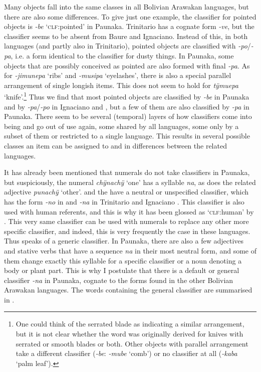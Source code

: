 Many objects fall into the same classes in all Bolivian Arawakan languages, but there are also some differences. To give just one example, the classifier for pointed objects is \textit{-be} ‘\textsc{clf:}pointed’ in Paunaka. Trinitario has a cognate form \textit{-ve}, but the classifier seems to be absent from Baure and Ignaciano. Instead of this, in both languages (and partly also in Trinitario), pointed objects are classified with \textit{-po}/\textit{-pa}, i.e. a form identical to the classifier for dusty things. In Paunaka, some objects that are possibly conceived as pointed are also formed with final \textit{-pa}. As for \textit{-jimunepa} ‘ribs’ and \textit{-musipa} ‘eyelashes’, there is also a special parallel arrangement of single longish items. This does not seem to hold for \textit{tÿmuepa} ‘knife’.\footnote{One could think of the serrated blade as indicating a similar arrangement, but it is not clear whether the word was originally derived for knives with serrated or smooth blades or both. Other objects with parallel arrangement take a different classifier (\textit{-be}: \textit{-mube} ‘comb’) or no classifier at all (\textit{-kaba} ‘palm leaf’).} Thus we find that most pointed objects are classified by \textit{-be} in Paunaka and by \textit{-pa}/\textit{-po} in Ignaciano and , but a few of them are also classified by \textit{-pa} in Paunaka. There seem to be several (temporal) layers of how classifiers come into being and go out of use again, some shared by all languages, some only by a subset of them or restricted to a single language. This results in several possible classes an item can be assigned to and in differences between the related languages.

It has already been mentioned that numerals do not take classifiers in Paunaka, but suspiciously, the numeral \textit{chÿnachÿ} ‘one’ has a syllable \textit{na}, as does the related adjective \textit{punachÿ} ‘other’.  and the  have a neutral or unspecified classifier, which has the form \textit{-no} in  and \textit{-na} in Trinitario and Ignaciano \citep[148]{Terhart2016}. This classifier is also used with human referents, and this is why it has been glossed as ‘\textsc{clf:}human’ by \citet[148]{Danielsen2007}. This very same classifier can be used with numerals to replace any other more specific classifier, and indeed, this is very frequently the case in these languages. Thus \citet[]{Rose2019b} speaks of a generic classifier. In Paunaka, there are also a few adjectives and stative verbs that have a sequence \textit{na} in their most neutral form, and some of them change exactly this syllable for a specific classifier or a noun denoting a body or plant part. This is why I postulate that there is a default or general classifier \textit{-na} in Paunaka, cognate to the forms found in the other Bolivian Arawakan languages.
 The words containing the general classifier are summarised in .

